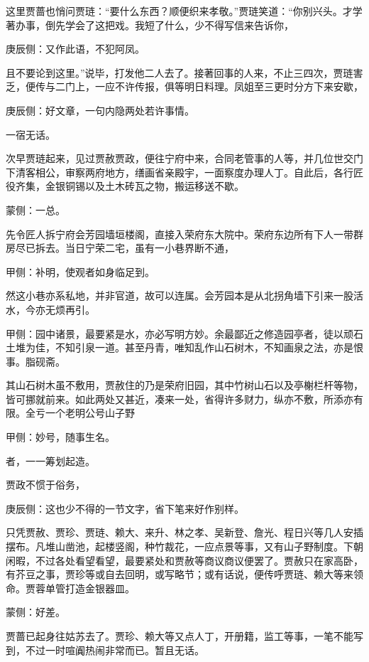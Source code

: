 \begin{parag}
    这里贾蔷也悄问贾琏：“要什么东西？顺便织来孝敬。”贾琏笑道：“你别兴头。才学著办事，倒先学会了这把戏。我短了什么，少不得写信来告诉你，\begin{note}庚辰侧：又作此语，不犯阿凤。\end{note}且不要论到这里。”说毕，打发他二人去了。接著回事的人来，不止三四次，贾琏害乏，便传与二门上，一应不许传报，俱等明日料理。凤姐至三更时分方下来安歇，\begin{note}庚辰侧：好文章，一句内隐两处若许事情。\end{note}一宿无话。
\end{parag}


\begin{parag}
    次早贾琏起来，见过贾赦贾政，便往宁府中来，合同老管事的人等，并几位世交门下清客相公，审察两府地方，缮画省亲殿宇，一面察度办理人丁。自此后，各行匠役齐集，金银铜锡以及土木砖瓦之物，搬运移送不歇。\begin{note}蒙侧：一总。\end{note}先令匠人拆宁府会芳园墙垣楼阁，直接入荣府东大院中。荣府东边所有下人一带群房尽已拆去。当日宁荣二宅，虽有一小巷界断不通，\begin{note}甲侧：补明，使观者如身临足到。\end{note}然这小巷亦系私地，并非官道，故可以连属。会芳园本是从北拐角墙下引来一股活水，今亦无烦再引。\begin{note}甲侧：园中诸景，最要紧是水，亦必写明方妙。余最鄙近之修造园亭者，徒以顽石土堆为佳，不知引泉一道。甚至丹青，唯知乱作山石树木，不知画泉之法，亦是恨事。脂砚斋。\end{note}其山石树木虽不敷用，贾赦住的乃是荣府旧园，其中竹树山石以及亭榭栏杆等物，皆可挪就前来。如此两处又甚近，凑来一处，省得许多财力，纵亦不敷，所添亦有限。全亏一个老明公号山子野\begin{note}甲侧：妙号，随事生名。\end{note}者，一一筹划起造。
\end{parag}


\begin{parag}
    贾政不惯于俗务，\begin{note}庚辰侧：这也少不得的一节文字，省下笔来好作别样。\end{note}只凭贾赦、贾珍、贾琏、赖大、来升、林之孝、吴新登、詹光、程日兴等几人安插摆布。凡堆山凿池，起楼竖阁，种竹裁花，一应点景等事，又有山子野制度。下朝闲暇，不过各处看望看望，最要紧处和贾赦等商议商议便罢了。贾赦只在家高卧，有芥豆之事，贾珍等或自去回明，或写略节；或有话说，便传呼贾琏、赖大等来领命。贾蓉单管打造金银器皿。\begin{note}蒙侧：好差。\end{note}贾蔷已起身往姑苏去了。贾珍、赖大等又点人丁，开册籍，监工等事，一笔不能写到，不过一时喧阗热闹非常而已。暂且无话。
\end{parag}


